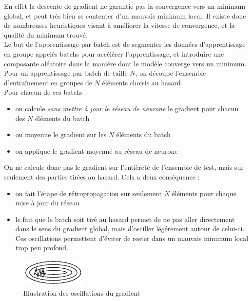 En effet la descente de gradient ne garantie pas la convergence vers un minimum global, et peut très bien se contenter d'un mauvais minimum local.
Il existe donc de nombreuses heuristiques visant à améliorer la vitesse de convergence, et la qualité du minimum trouvé.
\\

Le but de l'apprentissage par batch est de segmenter les données d'apprentissage en groupe appelés batchs pour accélérer l'apprentissage, et introduire une 
composante aléatoire dans la manière dont le modèle converge vers un minimum.\\
Pour un apprentissage par batch de taille $N$, on découpe l'ensemble d'entraînement en groupes de $N$ éléments choisis au hasard.\\
Pour chacun de ces batchs :
\begin{itemize}
 \item on calcule \textit{sans mettre à jour le réseau de neurone} le gradient pour chacun des $N$ éléments du batch
 \item on moyenne le gradient sur les $N$ éléments du batch
 \item on applique le gradient moyenné au réseau de neurone
\end{itemize}

On ne calcule donc pas le gradient sur l’entièreté de l'ensemble de test, mais sur seulement des parties tirées au hasard.
Cela a deux conséquence : 
\begin{itemize}
 \item on fait l'étape de rétropropagation sur seulement $N$ éléments pour chaque mise à jour du réseau
 \item le fait que le batch soit tiré au hasard permet de ne pas aller directement dans le sens du gradient global, mais d'osciller légérement autour de celui-ci.
 Ces oscillations permettent d'éviter de rester dans un mauvais minimum local trop peu profond.
\end{itemize}

\begin{figure}[h]
 \centering
 \includegraphics[width=0.3\textwidth]{img/oscillations_stochastique.png}
 \caption{Illustration des oscillations du gradient}
 \label{fig:oscillations_stochastique.png}
\end{figure}

